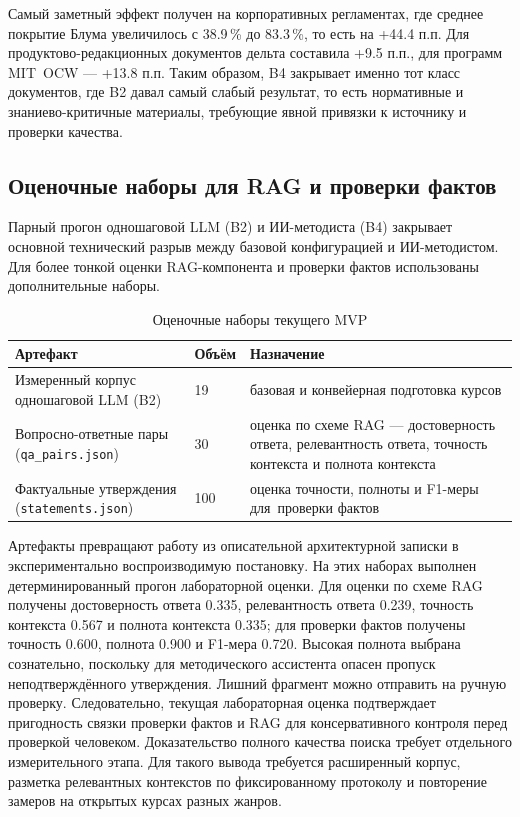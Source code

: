 Самый заметный эффект получен на корпоративных регламентах, где
среднее покрытие Блума увеличилось с 38.9\,\% до 83.3\,\%,
то есть на +44.4 п.п. Для продуктово-редакционных документов
дельта составила +9.5 п.п., для программ MIT~OCW — +13.8 п.п.
Таким образом, B4 закрывает именно тот класс документов, где B2 давал
самый слабый результат, то есть нормативные и знаниево-критичные материалы, требующие
явной привязки к источнику и проверки качества.

\subsection{Оценочные наборы для RAG и проверки фактов}

Парный прогон одношаговой LLM (B2) и ИИ-методиста (B4) закрывает
основной технический разрыв между базовой конфигурацией и ИИ-методистом.
Для более тонкой оценки RAG-компонента и проверки фактов использованы
дополнительные наборы.

\begin{table}[H]
  \caption{Оценочные наборы текущего MVP}
  \label{tab:evalassets}
  \centering
  \begin{tabular}{|P{5.5cm}|P{2.5cm}|P{6.0cm}|}
  \hline
  \textbf{Артефакт}
    & \textbf{Объём}
    & \textbf{Назначение} \\
  \hline
  Измеренный корпус одношаговой LLM (B2)
    & 19
    & базовая и конвейерная подготовка курсов \\
  \hline
  Вопросно-ответные пары (\texttt{qa\_pairs.json})
    & 30
    & оценка по схеме RAG — достоверность ответа, релевантность ответа,
      точность контекста и полнота контекста \\
  \hline
  Фактуальные утверждения (\texttt{statements.json})
    & 100
    & оценка точности, полноты и F1-меры для~проверки фактов \\
  \hline
  \end{tabular}
\end{table}

Артефакты превращают работу из описательной архитектурной записки
в экспериментально воспроизводимую постановку. На этих наборах выполнен
детерминированный прогон лабораторной оценки. Для оценки по схеме RAG получены
достоверность ответа 0.335, релевантность ответа 0.239, точность контекста 0.567
и полнота контекста 0.335; для проверки фактов получены точность 0.600,
полнота 0.900 и F1-мера 0.720. Высокая полнота выбрана сознательно, поскольку для
методического ассистента опасен пропуск неподтверждённого утверждения.
Лишний фрагмент можно отправить на ручную проверку.
Следовательно, текущая лабораторная оценка подтверждает пригодность
связки проверки фактов и RAG для консервативного контроля перед
проверкой человеком. Доказательство полного качества поиска требует
отдельного измерительного этапа.
Для такого вывода требуется расширенный корпус, разметка
релевантных контекстов по фиксированному протоколу и повторение замеров на открытых курсах разных
жанров.

